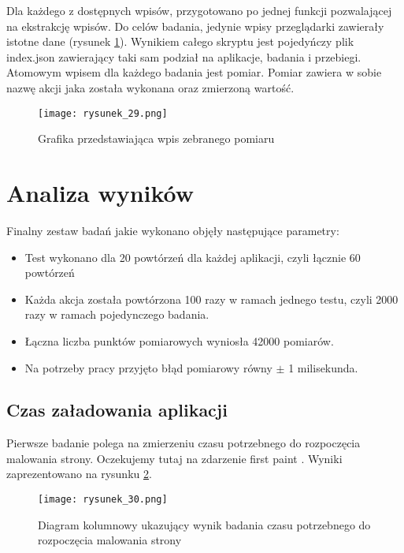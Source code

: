 Dla każdego z dostępnych wpisów, przygotowano po jednej funkcji pozwalającej na ekstrakcję wpisów.
Do celów badania, jedynie wpisy przeglądarki zawierały istotne dane (rysunek \ref{fig:rysunek_29}).
Wynikiem całego skryptu jest pojedyńczy plik index.json zawierający taki sam podział na aplikacje, badania i przebiegi.
Atomowym wpisem dla każdego badania jest pomiar. Pomiar zawiera w sobie nazwę akcji jaka została wykonana oraz zmierzoną wartość.

\begin{figure}[htbp]
    \centering
    \texttt{[image: rysunek\_29.png]}
    \caption{Grafika przedstawiająca wpis zebranego pomiaru}
    \label{fig:rysunek_29}
\end{figure}

\clearpage
\section{Analiza wyników}

Finalny zestaw badań jakie wykonano objęły następujące parametry:
\begin{itemize}
    \item Test wykonano dla 20 powtórzeń dla każdej aplikacji, czyli łącznie 60 powtórzeń
    \item Każda akcja została powtórzona 100 razy w ramach jednego testu, czyli 2000 razy w ramach pojedynczego badania.
    \item Łączna liczba punktów pomiarowych wyniosła 42000 pomiarów.
    \item Na potrzeby pracy przyjęto błąd pomiarowy równy $\pm$ 1 milisekunda.
\end{itemize}

\subsection{Czas załadowania aplikacji}

Pierwsze badanie polega na zmierzeniu czasu potrzebnego do rozpoczęcia malowania strony. Oczekujemy tutaj na zdarzenie first paint \cite{mdn-first-paint}.
Wyniki zaprezentowano na rysunku \ref{fig:rysunek_30}.

\begin{figure}[htbp]
    \centering
    \texttt{[image: rysunek\_30.png]}
    \caption{Diagram kolumnowy ukazujący wynik badania czasu potrzebnego do rozpoczęcia malowania strony}
    \label{fig:rysunek_30}
\end{figure}

